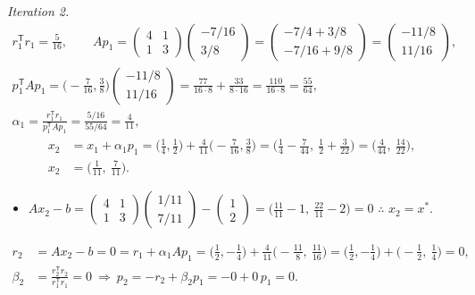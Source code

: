 \documentclass[11pt,a4paper]{article}
\newcommand{\T}{^{\mathsf T}}
\begin{document}
\emph{Iteration 2.}
\begin{gather*}
r_1\T r_1=\frac5{16},\qquad
Ap_1=\begin{pmatrix}4&1\\1&3\end{pmatrix}\begin{pmatrix}-7/16\\3/8\end{pmatrix}
=\begin{pmatrix}-7/4+3/8\\-7/16+9/8\end{pmatrix}=\begin{pmatrix}-11/8\\11/16\end{pmatrix},\\
p_1\T Ap_1=\Big(-\frac7{16},\frac38\Big)\begin{pmatrix}-11/8\\11/16\end{pmatrix}
=\frac{77}{16\cdot8}+\frac{33}{8\cdot16}=\frac{110}{16\cdot8}=\frac{55}{64},\\
\alpha_1=\frac{r_1\T r_1}{p_1\T Ap_1}=\frac{5/16}{55/64}=\frac4{11},
\end{gather*}
\begin{align*}
x_2&=x_1+\alpha_1p_1=\Big(\frac14,\frac12\Big)+\frac4{11}\Big(-\frac7{16},\frac38\Big)
=\Big(\frac14-\frac7{44},\ \frac12+\frac3{22}\Big)
=\Big(\frac4{44},\ \frac{14}{22}\Big),\\
x_2&=\Big(\frac1{11},\ \frac7{11}\Big).
\end{align*}
\begin{itemize}
\item \(\displaystyle Ax_2-b=\begin{pmatrix}4&1\\1&3\end{pmatrix}\begin{pmatrix}1/11\\7/11\end{pmatrix}-\begin{pmatrix}1\\2\end{pmatrix}
=\Big(\frac{11}{11}-1,\ \frac{22}{11}-2\Big)=0\)
\quad $\therefore$ $x_2=x^*$.
\end{itemize}
\begin{align*}
r_2&=Ax_2-b=0=r_1+\alpha_1Ap_1
=\Big(\frac12,-\frac14\Big)+\frac4{11}\Big(-\frac{11}8,\ \frac{11}{16}\Big)
=\Big(\frac12,-\frac14\Big)+\Big(-\frac12,\ \frac14\Big)=0,\\
\beta_2&=\frac{r_2\T r_2}{r_1\T r_1}=0\ \Rightarrow\ p_2=-r_2+\beta_2p_1=-0+0\,p_1=0 .
\end{align*}
\end{document}
